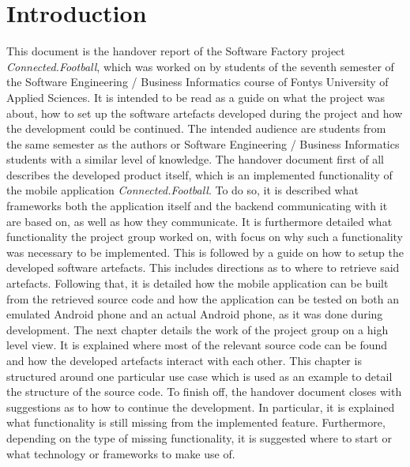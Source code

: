 \section{Introduction}
\label{sec:introduction}

This document is the handover report of the Software Factory project \textit{Connected.Football}, which was worked on by students of the seventh semester of the Software Engineering / Business Informatics course of Fontys University of Applied Sciences. It is intended to be read as a guide on what the project was about, how to set up the software artefacts developed during the project and how the development could be continued. The intended audience are students from the same semester as the authors or Software Engineering / Business Informatics students with a similar level of knowledge.
\newline
The handover document first of all describes the developed product itself, which is an implemented functionality of the mobile application \textit{Connected.Football}. To do so, it is described what frameworks both the application itself and the backend communicating with it are based on, as well as how they communicate. It is furthermore detailed what functionality the project group worked on, with focus on why such a functionality was necessary to be implemented.
\newline
This is followed by a guide on how to setup the developed software artefacts. This includes directions as to where to retrieve said artefacts. Following that, it is detailed how the mobile application can be built from the retrieved source code and how the application can be tested on both an emulated Android phone and an actual Android phone, as it was done during development.
\newline
The next chapter details the work of the project group on a high level view. It is explained where most of the relevant source code can be found and how the developed artefacts interact with each other. This chapter is structured around one particular use case which is used as an example to detail the structure of the source code.
\newline
To finish off, the handover document closes with suggestions as to how to continue the development. In particular, it is explained what functionality is still missing from the implemented feature. Furthermore, depending on the type of missing functionality, it is suggested where to start or what technology or frameworks to make use of.